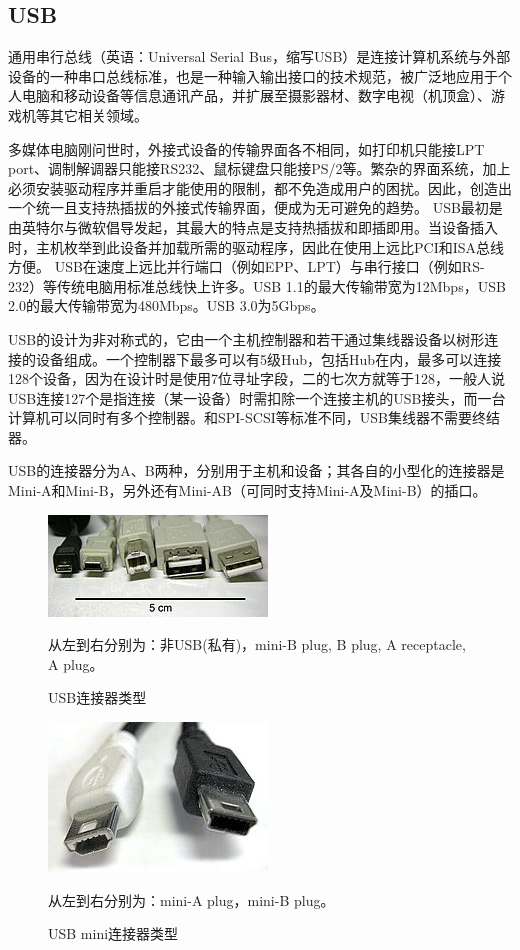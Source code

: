 \subsection{USB}

通用串行总线（英语：Universal Serial Bus，缩写USB）是连接计算机系统与外部设备的一种串口总线标准，也是一种输入输出接口的技术规范，被广泛地应用于个人电脑和移动设备等信息通讯产品，并扩展至摄影器材、数字电视（机顶盒）、游戏机等其它相关领域。

多媒体电脑刚问世时，外接式设备的传输界面各不相同，如打印机只能接LPT port、调制解调器只能接RS232、鼠标键盘只能接PS/2等。繁杂的界面系统，加上必须安装驱动程序并重启才能使用的限制，都不免造成用户的困扰。因此，创造出一个统一且支持热插拔的外接式传输界面，便成为无可避免的趋势。
USB最初是由英特尔与微软倡导发起，其最大的特点是支持热插拔和即插即用。当设备插入时，主机枚举到此设备并加载所需的驱动程序，因此在使用上远比PCI和ISA总线方便。
USB在速度上远比并行端口（例如EPP、LPT）与串行接口（例如RS-232）等传统电脑用标准总线快上许多。USB 1.1的最大传输带宽为12Mbps，USB 2.0的最大传输带宽为480Mbps。USB 3.0为5Gbps。

USB的设计为非对称式的，它由一个主机控制器和若干通过集线器设备以树形连接的设备组成。一个控制器下最多可以有5级Hub，包括Hub在内，最多可以连接128个设备，因为在设计时是使用7位寻址字段，二的七次方就等于128，一般人说USB连接127个是指连接（某一设备）时需扣除一个连接主机的USB接头，而一台计算机可以同时有多个控制器。和SPI-SCSI等标准不同，USB集线器不需要终结器。

USB的连接器分为A、B两种，分别用于主机和设备；其各自的小型化的连接器是Mini-A和Mini-B，另外还有Mini-AB（可同时支持Mini-A及Mini-B）的插口。
\begin{figure}[ht]
	\begin{center}
		\includegraphics[keepaspectratio,width=0.5\paperwidth]{USB_types_2.jpg}
	\end{center}
	\caption{USB连接器类型}
	从左到右分别为：非USB(私有)，mini-B plug, B plug, A receptacle, A plug。
	\label{fig:USBconnectors}
\end{figure}

\begin{figure}[ht]
	\begin{center}
		\includegraphics[keepaspectratio,width=0.5\paperwidth]{Mini_usb_AB.jpg}
	\end{center}
	\caption{USB mini连接器类型}
	从左到右分别为：mini-A plug，mini-B plug。
	\label{fig:USBconnectors}
\end{figure}

